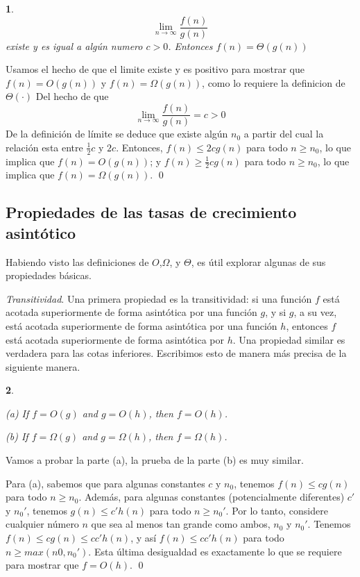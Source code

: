 \documentclass[a4paper, 12pt]{book}
\theoremstyle{dotless}
\newtheorem{theorem}{}[section]
\renewenvironment{proof}{\vspace{12pt}{\noindent\bfseries Demostración.}}{\qed\vspace{12pt}}
\begin{document}
\begin{theorem}
%
$$\lim_{n \to \infty} \frac{f(n)}{g(n)}$$
%
existe y es igual a algún numero $c > 0$. Entonces $f(n) =  \Theta(g(n))$
\end{theorem}
%
\begin{proof}
Usamos el hecho de que el limite existe y es positivo para mostrar que $f(n) = O(g(n))$ y $f(n) = \Omega(g(n))$, como lo requiere la definicion de $\Theta(\cdot)$
%
Del hecho de que
%
$$\lim_{n \to \infty} \frac{f(n)}{g(n)} = c > 0$$
%
De la definición de límite se deduce que existe algún $n_0$ a partir del cual la relación esta entre $\frac{1}{2}c$ y $2c$.
Entonces, $f(n) \leq 2cg(n)$ para todo $n \geq n_0$, lo que implica que $f(n) = O(g(n))$; y $f(n) \geq \frac{1}{2}cg(n)$ para todo $n \geq n_0$, lo que implica que $f(n) = \Omega(g(n))$.
%
\end{proof}


\subsection*{Propiedades de las tasas de crecimiento asintótico}

Habiendo visto las definiciones de $O$,$\Omega$, y $\Theta$, es útil explorar algunas de sus propiedades básicas.

\textit{Transitividad}. Una primera propiedad es la transitividad: si una función $f$ está acotada superiormente de forma asintótica por una función $g$, y si $g$, a su vez, está acotada superiormente de forma asintótica por una función $h$, entonces $f$ está acotada superiormente de forma asintótica por $h$. Una propiedad similar es verdadera para las cotas inferiores. Escribimos esto de manera más precisa de la siguiente manera.

\begin{theorem}
\label{thm:transitive}
{\hspace{12pt}}

(a) If \(f=O(g)\) and \(g=O(h)\), then \(f=O(h)\).

(b) If \(f=\Omega(g)\) and \(g=\Omega(h)\), then \(f=\Omega(h)\).
\end{theorem}

\begin{proof}
Vamos a probar la parte (a), la prueba de la parte (b) es muy similar. 

Para (a), sabemos que para algunas constantes $c$ y $n_0$, tenemos $f(n) \leq cg(n)$ para todo $n \geq n_0$. Además, para algunas constantes (potencialmente diferentes) $c'$ y $n_0'$, tenemos $g(n) \leq c'h(n)$ para todo $n \geq n_0'$. Por lo tanto, considere cualquier número $n$ que sea al menos tan grande como ambos, $n_0$ y $n_0'$. Tenemos $f(n) \leq cg(n) \leq cc'h(n)$, y así $f(n) \leq cc'h(n)$ para todo $n \geq max(n0, n_0')$. Esta última desigualdad es exactamente lo que se requiere para mostrar que $f=O(h)$.
\end{proof}
\end{document}
